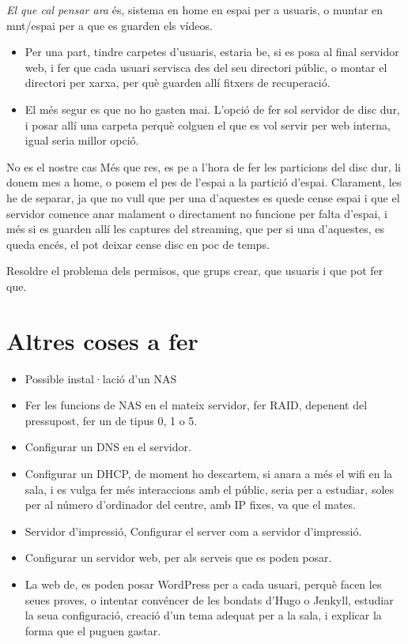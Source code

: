 \documentclass[
  10pt,
]{krantz}
\providecommand{\tightlist}{%
  \setlength{\itemsep}{0pt}\setlength{\parskip}{0pt}}
\begin{document}
\emph{El que cal pensar ara} és, sistema en home en espai per a usuaris, o muntar en mnt/espai per a que es guarden els vídeos.

\begin{itemize}
\tightlist
\item
  Per una part, tindre carpetes d'usuaris, estaria be, si es posa al final servidor web, i fer que cada usuari servisca des del seu directori públic, o montar el directori per xarxa, per què guarden allí fitxers de recuperació.
\item
  El més segur es que no ho gasten mai. L'opció de fer sol servidor de disc dur, i posar allí una carpeta perquè colguen el que es vol servir per web interna, igual seria millor opció.
\end{itemize}

\begin{rmdnote}{No es el nostre cas}
Més que res, es pe a l'hora de fer les particions del disc dur, li donem mes a home, o posem el pes de l'espai a la partició d'espai. Clarament, les he de separar, ja que no vull que per una d'aquestes es quede cense espai i que el servidor comence anar malament o directament no funcione per falta d'espai, i més si es guarden allí les captures del streaming, que per si una d'aquestes, es queda encés, el pot deixar cense disc en poc de temps.

\end{rmdnote}

Resoldre el problema dels permisos, que grups crear, que usuaris i que pot fer que.

\hypertarget{altres-coses-a-fer}{%
\section{Altres coses a fer}\label{altres-coses-a-fer}}

\begin{itemize}
\item
  Possible instal·lació d'un NAS
\item
  Fer les funcions de NAS en el mateix servidor, fer RAID, depenent del pressupost, fer un de tipus 0, 1 o 5.
\item
  Configurar un DNS en el servidor.
\item
  Configurar un DHCP, de moment ho descartem, si anara a més el wifi en la sala, i es vulga fer més interaccions amb el públic, seria per a estudiar, soles per al número d'ordinador del centre, amb IP fixes, va que el mates.
\item
  Servidor d'impressió, Configurar el server com a servidor d'impressió.
\item
  Configurar un servidor web, per als serveis que es poden posar.
\item
  La web de, es poden posar WordPress per a cada usuari, perquè facen les seues proves, o intentar convéncer de les bondats d'Hugo o Jenkyll, estudiar la seua configuració, creació d'un tema adequat per a la sala, i explicar la forma que el puguen gastar.
\end{itemize}
\end{document}
